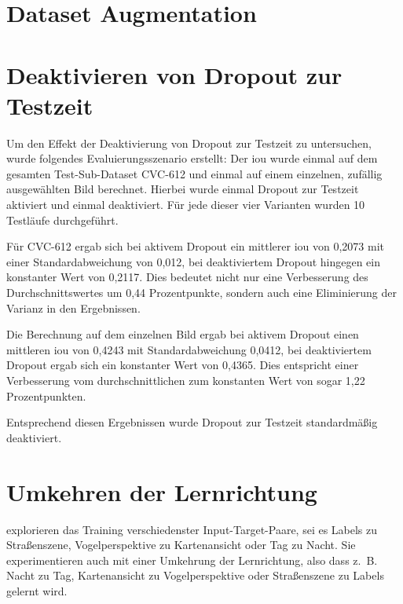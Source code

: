 



\section{Dataset Augmentation}



\section{Deaktivieren von Dropout zur Testzeit}

Um den Effekt der Deaktivierung von Dropout zur Testzeit zu untersuchen, wurde folgendes Evaluierungsszenario erstellt:
Der \gls{iou} wurde einmal auf dem gesamten Test-Sub-Dataset CVC-612 und einmal auf einem einzelnen, zufällig ausgewählten Bild berechnet.
Hierbei wurde einmal Dropout zur Testzeit aktiviert und einmal deaktiviert.
Für jede dieser vier Varianten wurden 10 Testläufe durchgeführt.

Für CVC-612 ergab sich bei aktivem Dropout ein mittlerer \gls{iou} von 0,2073 mit einer Standardabweichung von 0,012, bei deaktiviertem Dropout hingegen ein konstanter Wert von 0,2117.
Dies bedeutet nicht nur eine Verbesserung des Durchschnittswertes um 0,44 Prozentpunkte, sondern auch eine Eliminierung der Varianz in den Ergebnissen.

Die Berechnung auf dem einzelnen Bild ergab bei aktivem Dropout einen mittleren \gls{iou} von 0,4243 mit Standardabweichung 0,0412, bei deaktiviertem Dropout ergab sich ein konstanter Wert von 0,4365.
Dies entspricht einer Verbesserung vom durchschnittlichen zum konstanten Wert von sogar 1,22 Prozentpunkten.

Entsprechend diesen Ergebnissen wurde Dropout zur Testzeit standardmäßig deaktiviert.



\section{Umkehren der Lernrichtung}

\citeauthor{Isola.2017} explorieren das Training verschiedenster Input-Target-Paare, sei es Labels zu Straßenszene, Vogelperspektive zu Kartenansicht oder Tag zu Nacht.
Sie experimentieren auch mit einer Umkehrung der Lernrichtung, also dass z.~B. Nacht zu Tag, Kartenansicht zu Vogelperspektive oder Straßenszene zu Labels gelernt wird.

